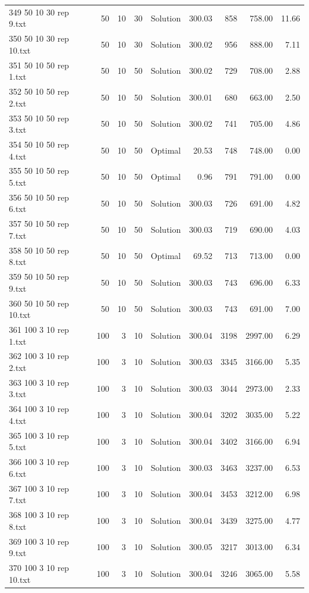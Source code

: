 \begin{longtable}{lrrllrrrr}
349 50 10 30 rep 9.txt & 50 & 10 & 30 & Solution & 300.03 & 858 & 758.00 & 11.66\\
350 50 10 30 rep 10.txt & 50 & 10 & 30 & Solution & 300.02 & 956 & 888.00 &  7.11\\
351 50 10 50 rep 1.txt & 50 & 10 & 50 & Solution & 300.02 & 729 & 708.00 &  2.88\\
352 50 10 50 rep 2.txt & 50 & 10 & 50 & Solution & 300.01 & 680 & 663.00 &  2.50\\
353 50 10 50 rep 3.txt & 50 & 10 & 50 & Solution & 300.02 & 741 & 705.00 &  4.86\\
354 50 10 50 rep 4.txt & 50 & 10 & 50 & Optimal & 20.53 & 748 & 748.00 &  0.00\\
355 50 10 50 rep 5.txt & 50 & 10 & 50 & Optimal &  0.96 & 791 & 791.00 &  0.00\\
356 50 10 50 rep 6.txt & 50 & 10 & 50 & Solution & 300.03 & 726 & 691.00 &  4.82\\
357 50 10 50 rep 7.txt & 50 & 10 & 50 & Solution & 300.03 & 719 & 690.00 &  4.03\\
358 50 10 50 rep 8.txt & 50 & 10 & 50 & Optimal & 69.52 & 713 & 713.00 &  0.00\\
359 50 10 50 rep 9.txt & 50 & 10 & 50 & Solution & 300.03 & 743 & 696.00 &  6.33\\
360 50 10 50 rep 10.txt & 50 & 10 & 50 & Solution & 300.03 & 743 & 691.00 &  7.00\\
361 100 3 10 rep 1.txt & 100 & 3 & 10 & Solution & 300.04 & 3198 & 2997.00 &  6.29\\
362 100 3 10 rep 2.txt & 100 & 3 & 10 & Solution & 300.03 & 3345 & 3166.00 &  5.35\\
363 100 3 10 rep 3.txt & 100 & 3 & 10 & Solution & 300.03 & 3044 & 2973.00 &  2.33\\
364 100 3 10 rep 4.txt & 100 & 3 & 10 & Solution & 300.04 & 3202 & 3035.00 &  5.22\\
365 100 3 10 rep 5.txt & 100 & 3 & 10 & Solution & 300.04 & 3402 & 3166.00 &  6.94\\
366 100 3 10 rep 6.txt & 100 & 3 & 10 & Solution & 300.03 & 3463 & 3237.00 &  6.53\\
367 100 3 10 rep 7.txt & 100 & 3 & 10 & Solution & 300.04 & 3453 & 3212.00 &  6.98\\
368 100 3 10 rep 8.txt & 100 & 3 & 10 & Solution & 300.04 & 3439 & 3275.00 &  4.77\\
369 100 3 10 rep 9.txt & 100 & 3 & 10 & Solution & 300.05 & 3217 & 3013.00 &  6.34\\
370 100 3 10 rep 10.txt & 100 & 3 & 10 & Solution & 300.04 & 3246 & 3065.00 &  5.58\\

\end{longtable}
